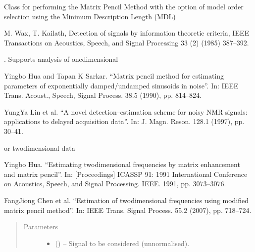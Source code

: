 \documentclass[letterpaper,10pt,english]{sphinxmanual}
\begin{document}
\begin{fulllineitems}
\label{\detokenize{references/mpm:nmrespy.mpm.MatrixPencil}}
\sphinxAtStartPar
Class for performing the Matrix Pencil Method with the option of model
order selection using the Minimum Description Length (MDL) %
\begin{footnote}[1]\sphinxAtStartFootnote
M. Wax, T. Kailath, Detection of signals by information theoretic
criteria, IEEE Transactions on Acoustics, Speech, and Signal Processing
33 (2) (1985) 387–392.
%
\end{footnote}. Supports
analysis of one\sphinxhyphen{}dimensional %
\begin{footnote}[2]\sphinxAtStartFootnote
Yingbo Hua and Tapan K Sarkar. “Matrix pencil method for estimating
parameters of exponentially damped/undamped sinusoids in noise”. In:
IEEE Trans. Acoust., Speech, Signal Process. 38.5 (1990), pp. 814–824.
%
\end{footnote} %
\begin{footnote}[3]\sphinxAtStartFootnote
Yung\sphinxhyphen{}Ya Lin et al. “A novel detection–estimation scheme for noisy
NMR signals: applications to delayed acquisition data”. In: J. Magn.
Reson. 128.1 (1997), pp. 30–41.
%
\end{footnote} or two\sphinxhyphen{}dimensional data %
\begin{footnote}[4]\sphinxAtStartFootnote
Yingbo Hua. “Estimating two\sphinxhyphen{}dimensional frequencies by matrix
enhancement and matrix pencil”. In: {[}Proceedings{]} ICASSP 91: 1991
International Conference on Acoustics, Speech, and Signal Processing.
IEEE. 1991, pp. 3073–3076.
%
\end{footnote} %
\begin{footnote}[5]\sphinxAtStartFootnote
Fang\sphinxhyphen{}Jiong Chen et al. “Estimation of two\sphinxhyphen{}dimensional frequencies
using modified matrix pencil method”. In: IEEE Trans. Signal Process.
55.2 (2007), pp. 718–724.
%
\end{footnote}
\begin{quote}\begin{description}
\item[{Parameters}] \leavevmode\begin{itemize}
\item {} 
\sphinxAtStartPar
{} () – Signal to be considered (unnormalised).


\end{itemize}
\end{description}
\end{quote}
\end{fulllineitems}
\end{document}
